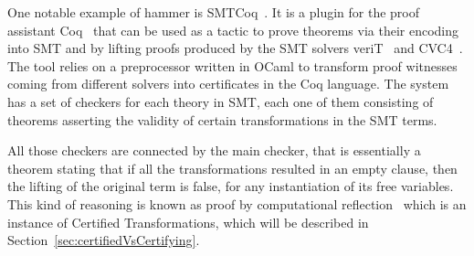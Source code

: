 One notable example of hammer is SMTCoq~\cite{smtcoq}.
It is a plugin for the proof assistant Coq~\cite{Bertot2004} that
can be used as a tactic to prove theorems via their encoding into
SMT and by lifting proofs produced by the SMT solvers veriT~\cite{Bouton2009}
and CVC4~\cite{Barrett2011}. The tool relies on a preprocessor written in OCaml
to transform proof witnesses coming from different solvers into certificates in
the Coq language. The system has a set of checkers for each theory in SMT, each
one of them consisting of theorems asserting the validity of certain transformations
in the SMT terms.


All those checkers are connected by the main checker, that
is essentially a theorem stating that if all the transformations resulted in an
empty clause, then the lifting of the original term is false, for any instantiation
of its free variables. This kind of reasoning is known as proof by computational
reflection~\cite{reflection} which is an instance of Certified Transformations, which will be described
in Section~\ref{sec:certifiedVsCertifying}.
